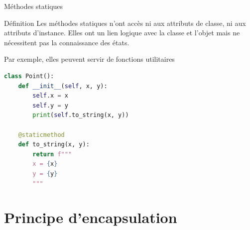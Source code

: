 \documentclass[10pt]{beamer}
\begin{document}









\begin{frame}[fragile]{Méthodes statiques}

  \begin{block}{Définition}
    \medskip
    Les méthodes statiques n'ont accès ni aux attributs de classe, ni aux attributs d'instance. Elles ont un lien logique avec la classe et l'objet mais ne nécessitent pas la connaissance des états.

    Par exemple, elles peuvent servir de fonctions utilitaires

  \end{block}
\begin{lstlisting}[language=Python, numbers=none, morekeywords={@staticmethod}]
class Point():
    def __init__(self, x, y):
        self.x = x
        self.y = y
        print(self.to_string(x, y))

    @staticmethod
    def to_string(x, y):
        return f"""
        x = {x}
        y = {y}         
        """
\end{lstlisting}
\end{frame}



\section{Principe d'encapsulation}
\end{document}
